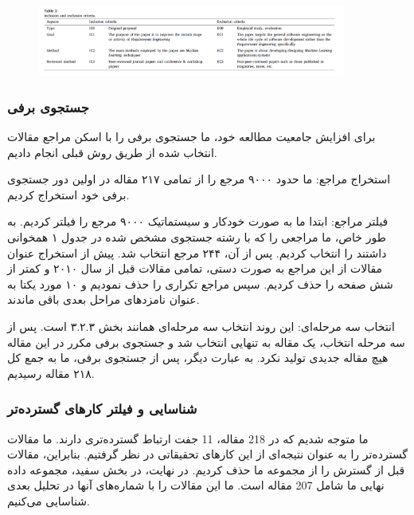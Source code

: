 \documentclass[a4paper,10pt]{article}
\begin{document}
                \begin{figure}
                    \centering
                    \includegraphics[width=0.9\textwidth]{Image/table-2.png}
                \end{figure}
            
            \subsubsection{جستجوی برفی}

                برای افزایش جامعیت مطالعه خود، ما جستجوی برفی را با اسکن مراجع مقالات انتخاب شده از طریق روش قبلی انجام دادیم.

                استخراج مراجع: ما حدود ۹۰۰۰ مرجع را از تمامی ۲۱۷ مقاله در اولین دور جستجوی برفی خود استخراج کردیم.
                
                فیلتر مراجع: ابتدا ما به صورت خودکار و سیستماتیک ۹۰۰۰ مرجع را فیلتر کردیم. به طور خاص، ما مراجعی را که با رشته جستجوی مشخص شده در جدول ۱ همخوانی داشتند را انتخاب کردیم. پس از آن، ۲۴۴ مرجع انتخاب شد. پیش از استخراج عنوان مقالات از این مراجع به صورت دستی، تمامی مقالات قبل از سال ۲۰۱۰ و کمتر از شش صفحه را حذف کردیم. سپس مراجع تکراری را حذف نمودیم و ۱۰ مورد یکتا به عنوان نامزدهای مراحل بعدی باقی ماندند.
                
                انتخاب سه مرحله‌ای: این روند انتخاب سه مرحله‌ای همانند بخش ۳.۲.۳ است. پس از سه مرحله انتخاب، یک مقاله به تنهایی انتخاب شد و جستجوی برفی مکرر در این مقاله هیچ مقاله جدیدی تولید نکرد. به عبارت دیگر، پس از جستجوی برفی، ما به جمع کل ۲۱۸ مقاله رسیدیم.
            
            \subsubsection{شناسایی و فیلتر کارهای گسترده‌تر}

                ما متوجه شدیم که در 218 مقاله، 11 جفت ارتباط گسترده‌تری دارند. ما مقالات گسترده‌تر را به عنوان نتیجه‌ای از این کارهای تحقیقاتی در نظر گرفتیم. بنابراین، مقالات قبل از گسترش را از مجموعه ما حذف کردیم. در نهایت، در بخش سفید، مجموعه داده نهایی ما شامل 207 مقاله است. ما این مقالات را با شماره‌های آنها در تحلیل بعدی شناسایی می‌کنیم.
        
\end{document}

